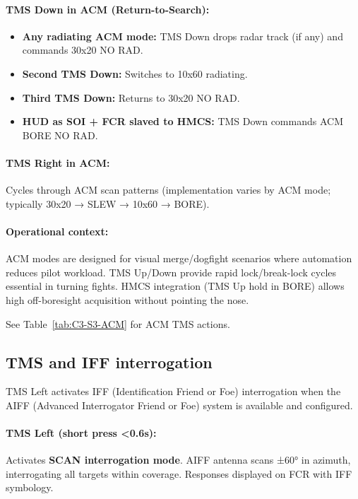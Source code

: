 \documentclass[11pt, a4paper, twoside]{report}
\begin{document}
\paragraph{TMS Down in ACM (Return-to-Search):}
\begin{itemize}
    \item \textbf{Any radiating ACM mode:} TMS Down drops radar track (if any) and commands 30x20 NO RAD.
    \item \textbf{Second TMS Down:} Switches to 10x60 radiating.
    \item \textbf{Third TMS Down:} Returns to 30x20 NO RAD.
    \item \textbf{HUD as SOI + FCR slaved to HMCS:} TMS Down commands ACM BORE NO RAD.
\end{itemize}

\paragraph{TMS Right in ACM:}
Cycles through ACM scan patterns (implementation varies by ACM mode; typically 30x20 → SLEW → 10x60 → BORE).

\paragraph{Operational context:}
ACM modes are designed for visual merge/dogfight scenarios where automation reduces pilot workload. TMS Up/Down provide rapid lock/break-lock cycles essential in turning fights. HMCS integration (TMS Up hold in BORE) allows high off-boresight acquisition without pointing the nose.

See Table~\ref{tab:C3-S3-ACM} for ACM TMS actions.

\subsection{TMS and IFF interrogation}
\label{sec:C3-S3-S5}

TMS Left activates IFF (Identification Friend or Foe) interrogation when the AIFF (Advanced Interrogator Friend or Foe) system is available and configured.

\paragraph{TMS Left (short press <0.6s):}
Activates \textbf{SCAN interrogation mode}. AIFF antenna scans ±60° in azimuth, interrogating all targets within coverage. Responses displayed on FCR with IFF symbology.
\end{document}
